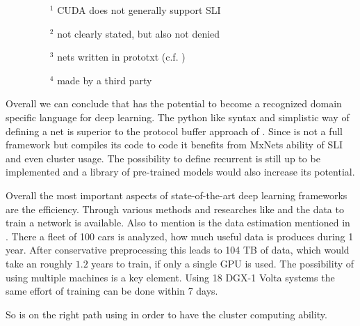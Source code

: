 \vspace{-1em}
\begin{figure}[H]
	\footnotesize
	\begin{multicols}{2}
	\begin{itemize}
		\item[$^1$] CUDA does not generally support SLI
		\item[$^2$] not clearly stated, but also not denied
		\item[$^3$] nets written in prototxt (c.f. )
		\item[$^4$] made by a third party\cite{CaffeOnSpark}
	\end{itemize}
	\end{multicols}
\end{figure}

Overall we can conclude that \cnnarch has the potential to become a recognized domain specific language for deep learning. The python like syntax and simplistic way of defining a net is superior to the protocol buffer approach of \caffe. Since \cnnarch is not a full framework but compiles its code to \mxnet code it benefits from MxNets ability of SLI and even cluster usage. The possibility to define recurrent \nns is still up to be implemented and a library of pre-trained models would also increase its potential.

Overall the most important aspects of state-of-the-art deep learning frameworks are the efficiency. Through various methods and researches like \kitti and \torcs the data to train a network is available.
Also to mention is the data estimation mentioned in \cite{grzywaczewski2017training}. There a fleet of 100 cars is analyzed, how much useful data is produces during 1 year. After conservative preprocessing this leads to 104 TB of data, which would take an \alexnet roughly $1.2$ years to train, if only a single GPU is used. The possibility of using multiple machines is a key element. Using 18 DGX-1 Volta systems the same effort of training can be done within 7 days.

So \cnnarch is on the right path using \mxnet in order to have the cluster computing ability.


